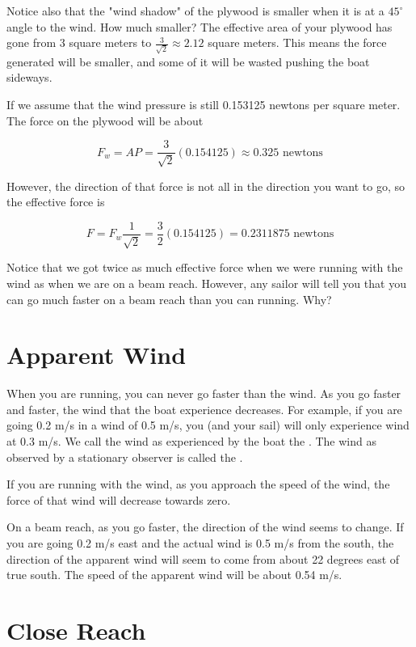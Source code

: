 Notice also that the "wind shadow" of the plywood is smaller when it is at a $45^\circ$ angle to the wind.  How much smaller?  The effective area of your plywood has 
gone from 3 square meters to $\frac{3}{\sqrt{2}} \approx 2.12$ square meters. This means the force generated will be smaller, and some of it will be wasted pushing the boat sideways.

If we assume that the wind pressure is still 0.153125 newtons per square meter. The force on the plywood will be about

$$F_w = A P = \frac{3}{\sqrt{2}}(0.154125) \approx 0.325 \text{ newtons}$$

However, the direction of that force is not all in the direction you want to go, so the effective force is

$$F = F_w \frac{1}{\sqrt{2}} =  \frac{3}{2}(0.154125) = 0.2311875 \text{ newtons}$$

Notice that we got twice as much effective force when we were running with the wind as when we are on a beam reach.  However, any sailor will tell you that you can go much faster
on a beam reach than you can running. Why?
\section{Apparent Wind}

When you are running,  you can never go faster than the wind.   As you go faster and faster,  the wind that the boat experience decreases. For example, if you are going 0.2 m/s in a wind 
of 0.5 m/s,  you (and your sail) will only experience wind at 0.3 m/s. We call the wind as experienced by the boat 
the .  The wind as observed by a stationary observer is called the .

If you are running with the wind, as you approach the speed of the wind,  the force of that wind will decrease towards zero.

On a beam reach, as you go faster, the direction of the wind seems to change. If you are going 0.2 m/s east and the actual wind is 0.5 m/s from the south, the direction of the 
apparent wind will seem to come from about 22 degrees east of true south.  The speed of the apparent wind will be about 0.54 m/s.

\section{Close Reach}

